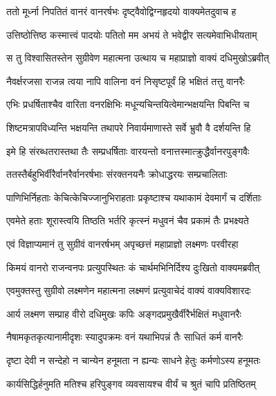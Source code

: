 
\twolineshloka
{ततो मूर्ध्ना निपतितं वानरं वानरर्षभः}
{दृष्ट्वैवोद्विग्नहृदयो वाक्यमेतदुवाच ह} %

\twolineshloka
{उत्तिष्ठोत्तिष्ठ कस्मात्त्वं पादयोः पतितो मम}
{अभयं ते भवेद्वीर सत्यमेवाभिधीयताम्} %

\twolineshloka
{स तु विश्वासितस्तेन सुग्रीवेण महात्मना}
{उत्थाय च महाप्राज्ञो वाक्यं दधिमुखोऽब्रवीत्} %

\twolineshloka
{नैवर्क्षरजसा राजन्न त्वया नापि वालिना}
{वनं निसृष्टपूर्वं हि भक्षितं तत्तु वानरैः} %

\twolineshloka
{एभिः प्रधर्षिताश्चैव वारिता वनरक्षिभिः}
{मधून्यचिन्तयित्वेमान्भक्षयन्ति पिबन्ति च} %

\twolineshloka
{शिष्टमत्रापविध्यन्ति भक्षयन्ति तथापरे}
{निवार्यमाणास्ते सर्वे भ्रुवौ वै दर्शयन्ति हि} %

\twolineshloka
{इमे हि संरब्धतरास्तथा तैः सम्प्रधर्षिताः}
{वारयन्तो वनात्तस्मात्क्रुद्धैर्वानरपुङ्गवैः} %

\twolineshloka
{ततस्तैर्बहुभिर्वीरैर्वानरैर्वानरर्षभाः}
{संरक्तनयनैः क्रोधाद्धरयः सम्प्रचालिताः} %

\twolineshloka
{पाणिभिर्निहताः केचित्केचिज्जानुभिराहताः}
{प्रकृष्टाश्च यथाकामं देवमार्गं च दर्शिताः} %

\twolineshloka
{एवमेते हताः शूरास्त्वयि तिष्ठति भर्तरि}
{कृत्स्नं मधुवनं चैव प्रकामं तैः प्रभक्ष्यते} %

\twolineshloka
{एवं विज्ञाप्यमानं तु सुग्रीवं वानरर्षभम्}
{अपृच्छत्तं महाप्राज्ञो लक्ष्मणः परवीरहा} %

\twolineshloka
{किमयं वानरो राजन्वनपः प्रत्युपस्थितः}
{कं चार्थमभिनिर्दिश्य दुःखितो वाक्यमब्रवीत्} %

\twolineshloka
{एवमुक्तस्तु सुग्रीवो लक्ष्मणेन महात्मना}
{लक्ष्मणं प्रत्युवाचेदं वाक्यं वाक्यविशारदः} %

\twolineshloka
{आर्य लक्ष्मण सम्प्राह वीरो दधिमुखः कपिः}
{अङ्गदप्रमुखैर्वीरैर्भक्षितं मधुवानरैः} %

\twolineshloka
{नैषामकृतकृत्यानामीदृशः स्यादुपक्रमः}
{वनं यथाभिपन्नं तैः साधितं कर्म वानरैः} %

\twolineshloka
{दृष्टा देवी न सन्देहो न चान्येन हनूमता}
{न ह्यन्यः साधने हेतुः कर्मणोऽस्य हनूमतः} %

\twolineshloka
{कार्यसिद्धिर्हनुमति मतिश्च हरिपुङ्गव}
{व्यवसायश्च वीर्यं च श्रुतं चापि प्रतिष्ठितम्} %


